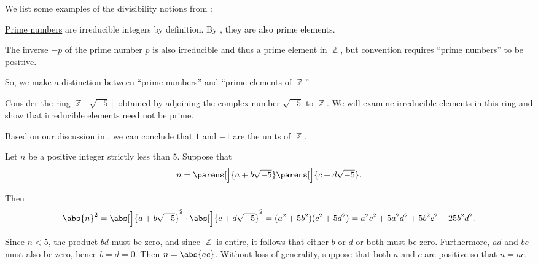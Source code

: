 \begin{example}\label{ex:def:domain_divisibility}
  We list some examples of the divisibility notions from :
  \begin{thmenum}
     \hyperref[def:prime_number]{Prime numbers} are irreducible integers by definition. By , they are also prime elements.

    The inverse \( -p \) of the prime number \( p \) is also irreducible and thus a prime element in \( \BbbZ \), but convention requires \enquote{prime numbers} to be positive.

    So, we make a distinction between \enquote{prime numbers} and \enquote{prime elements of \( \BbbZ \)}

     Consider the ring \( \BbbZ[\sqrt{-5}] \) obtained by \hyperref[thm:adjoining_elements_to_semiring]{adjoining} the complex number \( \sqrt{-5} \) to \( \BbbZ \). We will examine irreducible elements in this ring and show that irreducible elements need not be prime.

    Based on our discussion in , we can conclude that \( 1 \) and \( -1 \) are the units of \( \BbbZ \).

    Let \( n \) be a positive integer strictly less than \( 5 \). Suppose that
    \begin{equation}\label{eq:ex:def:domain_divisibility/irreducible_not_prime/decomposition}
      n = \parens[\Big]{ a + b \sqrt{-5} }\parens[\Big]{ c + d \sqrt{-5}}.
    \end{equation}

    Then
    \begin{equation}\label{eq:ex:def:domain_divisibility/irreducible_not_prime/abs}
      \abs{n}^2
      =
      \abs[\Big]{a + b \sqrt{-5}}^2 \cdot \abs[\Big]{c + d \sqrt{-5}}^2
      =
      (a^2 + 5b^2) (c^2 + 5d^2)
      =
      a^2 c^2 + 5a^2 d^2 + 5b^2 c^2 + 25 b^2 d^2.
    \end{equation}

    Since \( n < 5 \), the product \( bd \) must be zero, and since \( \BbbZ \) is entire, it follows that either \( b \) or \( d \) or both must be zero. Furthermore, \( ad \) and \( bc \) must also be zero, hence \( b = d = 0 \). Then \( n = \abs{ac} \). Without loss of generality, suppose that both \( a \) and \( c \) are positive so that \( n = ac \).


\end{thmenum}
\end{example}
